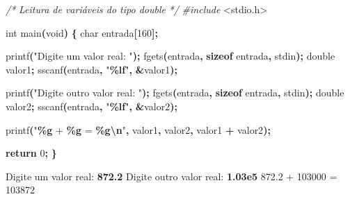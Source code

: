 \documentclass[
  11pt,
  a4paper,
]{scrbook}
\newenvironment{Shaded}{\begin{snugshade}}{\end{snugshade}}
\newcommand{\CommentTok}[1]{\textcolor[rgb]{0.56,0.35,0.01}{\textit{#1}}}
\newcommand{\ControlFlowTok}[1]{\textcolor[rgb]{0.13,0.29,0.53}{\textbf{#1}}}
\newcommand{\DataTypeTok}[1]{\textcolor[rgb]{0.13,0.29,0.53}{#1}}
\newcommand{\DecValTok}[1]{\textcolor[rgb]{0.00,0.00,0.81}{#1}}
\newcommand{\ImportTok}[1]{#1}
\newcommand{\KeywordTok}[1]{\textcolor[rgb]{0.13,0.29,0.53}{\textbf{#1}}}
\newcommand{\NormalTok}[1]{#1}
\newcommand{\OperatorTok}[1]{\textcolor[rgb]{0.81,0.36,0.00}{\textbf{#1}}}
\newcommand{\PreprocessorTok}[1]{\textcolor[rgb]{0.56,0.35,0.01}{\textit{#1}}}
\newcommand{\SpecialCharTok}[1]{\textcolor[rgb]{0.81,0.36,0.00}{\textbf{#1}}}
\newcommand{\StringTok}[1]{\textcolor[rgb]{0.31,0.60,0.02}{#1}}
\begin{document}
\begin{Shaded}
\begin{Highlighting}[]
\CommentTok{/*}
\CommentTok{Leitura de variáveis do tipo double}
\CommentTok{*/}
\PreprocessorTok{\#include }\ImportTok{\textless{}stdio.h\textgreater{}}

\DataTypeTok{int}\NormalTok{ main}\OperatorTok{(}\DataTypeTok{void}\OperatorTok{)} \OperatorTok{\{}
    \DataTypeTok{char}\NormalTok{ entrada}\OperatorTok{[}\DecValTok{160}\OperatorTok{];}

\NormalTok{    printf}\OperatorTok{(}\StringTok{"Digite um valor real: "}\OperatorTok{);}
\NormalTok{    fgets}\OperatorTok{(}\NormalTok{entrada}\OperatorTok{,} \KeywordTok{sizeof}\NormalTok{ entrada}\OperatorTok{,}\NormalTok{ stdin}\OperatorTok{);}
    \DataTypeTok{double}\NormalTok{ valor1}\OperatorTok{;}
\NormalTok{    sscanf}\OperatorTok{(}\NormalTok{entrada}\OperatorTok{,} \StringTok{"}\SpecialCharTok{\%lf}\StringTok{"}\OperatorTok{,} \OperatorTok{\&}\NormalTok{valor1}\OperatorTok{);}

\NormalTok{    printf}\OperatorTok{(}\StringTok{"Digite outro valor real: "}\OperatorTok{);}
\NormalTok{    fgets}\OperatorTok{(}\NormalTok{entrada}\OperatorTok{,} \KeywordTok{sizeof}\NormalTok{ entrada}\OperatorTok{,}\NormalTok{ stdin}\OperatorTok{);}
    \DataTypeTok{double}\NormalTok{ valor2}\OperatorTok{;}
\NormalTok{    sscanf}\OperatorTok{(}\NormalTok{entrada}\OperatorTok{,} \StringTok{"}\SpecialCharTok{\%lf}\StringTok{"}\OperatorTok{,} \OperatorTok{\&}\NormalTok{valor2}\OperatorTok{);}

\NormalTok{    printf}\OperatorTok{(}\StringTok{"}\SpecialCharTok{\%g}\StringTok{ + }\SpecialCharTok{\%g}\StringTok{ = }\SpecialCharTok{\%g\textbackslash{}n}\StringTok{"}\OperatorTok{,}\NormalTok{ valor1}\OperatorTok{,}\NormalTok{ valor2}\OperatorTok{,}\NormalTok{ valor1 }\OperatorTok{+}\NormalTok{ valor2}\OperatorTok{);}

    \ControlFlowTok{return} \DecValTok{0}\OperatorTok{;}
\OperatorTok{\}}
\end{Highlighting}
\end{Shaded}

\begin{Shaded}
\begin{Highlighting}[]
\NormalTok{Digite um valor real: }\KeywordTok{ 872.2 }
\NormalTok{Digite outro valor real: }\KeywordTok{ 1.03e5 }
\NormalTok{872.2 + 103000 = 103872}
\end{Highlighting}
\end{Shaded}
\end{document}
